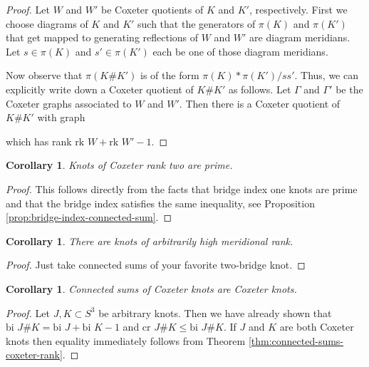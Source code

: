 \documentclass{article}
\newtheorem{corollary}[theorem]{Corollary}
\theoremstyle{definition}
\begin{document}
\begin{proof}
Let $W$ and $W'$ be Coxeter quotients of $K$ and $K'$, respectively. First we choose diagrams of $K$ and $K'$ such that the generators of $\pi(K)$ and $\pi(K')$ that get mapped to generating reflections of $W$ and $W'$ are diagram meridians. Let $s \in \pi(K)$ and $s' \in \pi(K')$ each be one of those diagram meridians.

Now observe that $\pi(K\#K')$ is of the form $\pi(K) * \pi(K') / ss'$. Thus, we can explicitly write down a Coxeter quotient of $K\#K'$ as follows. Let $\Gamma$ and $\Gamma'$ be the Coxeter graphs associated to $W$ and $W'$. Then there is a Coxeter quotient of $K\#K'$ with graph
\begin{center}
\end{center}
which has rank $\text{rk } W + \text{rk } W' - 1$. 
\end{proof}

\begin{corollary}
Knots of Coxeter rank two are prime.
\end{corollary}

\begin{proof}
This follows directly from the facts that bridge index one knots are prime and that the bridge index satisfies the same inequality, see Proposition \ref{prop:bridge-index-connected-sum}.
\end{proof}

\begin{corollary}
There are knots of arbitrarily high meridional rank.
\end{corollary}

\begin{proof}
Just take connected sums of your favorite two-bridge knot.
\end{proof}

\begin{corollary}
Connected sums of Coxeter knots are Coxeter knots.
\end{corollary}

\begin{proof}
Let $J, K \subset S^3$ be arbitrary knots. Then we have already shown that $\text{bi } J\#K = \text{bi } J + \text{bi } K - 1$ and $\text{cr } J\#K \leq \text{bi } J\#K$. If $J$ and $K$ are both Coxeter knots then equality immediately follows from Theorem \ref{thm:connected-sums-coxeter-rank}.
\end{proof}
\end{document}
